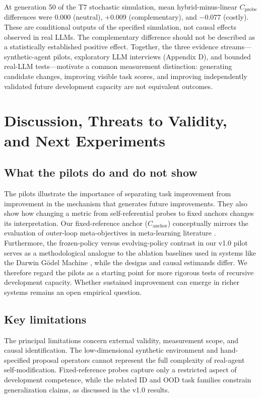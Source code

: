 \documentclass[11pt,a4paper]{article}
\begin{document}
At generation 50 of the T7 stochastic simulation, mean hybrid-minus-linear $C_{\mathrm{probe}}$ differences were 0.000 (neutral), +0.009 (complementary), and $-0.077$ (costly). These are conditional outputs of the specified simulation, not causal effects observed in real LLMs. The complementary difference should not be described as a statistically established positive effect. Together, the three evidence streams---synthetic-agent pilots, exploratory LLM interviews (Appendix D), and bounded real-LLM tests---motivate a common measurement distinction: generating candidate changes, improving visible task scores, and improving independently validated future development capacity are not equivalent outcomes.



\section{Discussion, Threats to Validity, and Next Experiments}
\subsection{What the pilots do and do not show}
The pilots illustrate the importance of separating task improvement from improvement in the mechanism that generates future improvements. They also show how changing a metric from self-referential probes to fixed anchors changes its interpretation. Our fixed-reference anchor (\(C_{\mathrm{anchor}}\)) conceptually mirrors the evaluation of outer-loop meta-objectives in meta-learning literature \cite{hospedales2021}. Furthermore, the frozen-policy versus evolving-policy contrast in our v1.0 pilot serves as a methodological analogue to the ablation baselines used in systems like the Darwin G\"odel Machine \cite{zhang2026}, while the designs and causal estimands differ. We therefore regard the pilots as a starting point for more rigorous tests of recursive development capacity. Whether sustained improvement can emerge in richer systems remains an open empirical question.

\subsection{Key limitations}
The principal limitations concern external validity, measurement scope, and causal identification.
The low-dimensional synthetic environment and hand-specified proposal operators cannot represent
the full complexity of real-agent self-modification. Fixed-reference probes capture only a restricted
aspect of development competence, while the related ID and OOD task families constrain generalization
claims, as discussed in the v1.0 results.
\end{document}
